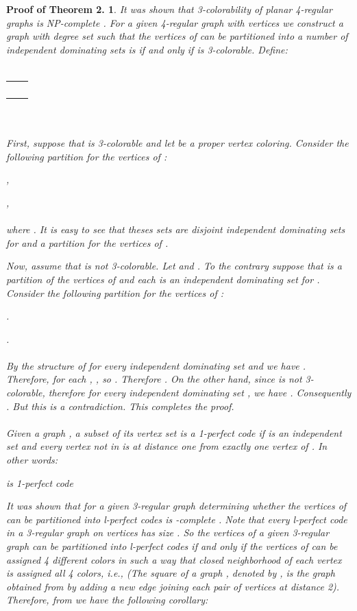 \documentclass[
final
]{dmtcs-episciences}
\newtheorem{prealii}{{\bf Proof of Theorem 2.}}
\newenvironment{alii}[1]{\begin{prealii}{\rm
			#1}\hfill{}}{\end{prealii}}
\begin{document}
\begin{alii}{
		 It was shown that  3-colorability of planar 4-regular
		graphs  is NP-complete \cite{MR573644}. For a given 4-regular
		graph  with  vertices we construct a  graph  with degree set 
		such that  the vertices of  can be partitioned into a number of  independent dominating sets is  if and only if  is 3-colorable. Define:
		\\ \\
		\begin{tabular}{r  l}
			  & 
			\\
			 & \\
			&\\
			&
		\end{tabular}
		\\ \\
		First, suppose that  is 3-colorable and let  be a proper vertex coloring.
		Consider the following partition for the vertices of :
		
		,
		
		
		,
		\\ \\
		where .
		It is easy to see that theses sets are disjoint independent dominating sets for  and a partition for the vertices of .
		
		
		Now, assume that  is not 3-colorable.
		Let  and .
		To the contrary suppose that  is a partition of the vertices of  and each  is an independent dominating set for .
		Consider the following partition for the vertices of :
		
		
		.
		
		.
		\\ \\
		By the structure of  for every independent dominating set  and  we have .
		Therefore, for each , , so .
		Therefore .
		On the other hand, since  is not 3-colorable, therefore for every independent dominating set , we have . Consequently . But this is a contradiction. This completes the proof.
		\\
		\\
		  Given a graph ,
		a subset  of its vertex set is a 1-perfect code if
		 is an independent set and every vertex not in  is at distance one from exactly one vertex of .
		In other words:
		
		\begin{center}
			 is 1-perfect code 
		\end{center}
		
		It was shown that for a given 3-regular graph  determining whether the vertices of  can be partitioned into l-perfect codes is -complete \cite{Kh}.
		Note that every l-perfect code in a 3-regular graph on  vertices has size .
		So the vertices of a given 3-regular graph  can be partitioned into l-perfect codes if and only if the vertices of  can be assigned 4 different colors in such a way that closed neighborhood of each vertex is
		assigned all 4 colors, i.e.,   (The square of a graph , denoted by
		, is the graph obtained from  by adding a new edge joining each pair of vertices at
		distance 2). Therefore, from \cite{Kh} we have the following corollary:
		
}
\end{alii}
\end{document}
